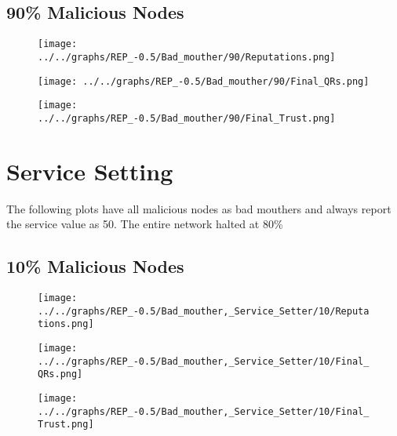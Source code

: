 \begin{minipage}[t]{0.49\columnwidth}
\subsection*{90\% Malicious Nodes}
    \begin{figure}[H]
        \centering
        \texttt{[image: ../../graphs/REP\_-0.5/Bad\_mouther/90/Reputations.png]}
    \end{figure}
    \begin{figure}[H]
        \centering
        \texttt{[image: ../../graphs/REP\_-0.5/Bad\_mouther/90/Final\_QRs.png]}
    \end{figure}
\end{minipage}
\begin{minipage}[t]{0.49\columnwidth}
    \begin{figure}[H]
        \centering
        \texttt{[image: ../../graphs/REP\_-0.5/Bad\_mouther/90/Final\_Trust.png]}
    \end{figure}
\end{minipage}
\newpage

\section*{Service Setting}
The following plots have all malicious nodes as bad mouthers and always
report the service value as 50. The entire network halted at 80\%
\\
\begin{minipage}[t]{0.49\columnwidth}
\subsection*{10\% Malicious Nodes}
    \begin{figure}[H]
        \centering
        \texttt{[image: ../../graphs/REP\_-0.5/Bad\_mouther,\_Service\_Setter/10/Reputations.png]}
    \end{figure}
    \begin{figure}[H]
        \centering
        \texttt{[image: ../../graphs/REP\_-0.5/Bad\_mouther,\_Service\_Setter/10/Final\_QRs.png]}
    \end{figure}
\end{minipage}
\begin{minipage}[t]{0.49\columnwidth}
    \begin{figure}[H]
        \centering
        \texttt{[image: ../../graphs/REP\_-0.5/Bad\_mouther,\_Service\_Setter/10/Final\_Trust.png]}
    \end{figure}
\end{minipage}

